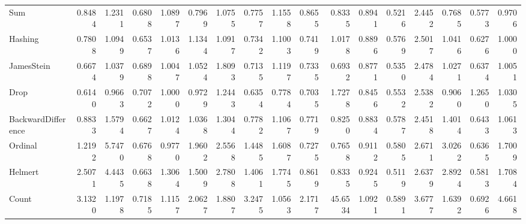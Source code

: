 \begin{tabular}{lrrrrrrrrrrrrrrrr}
Sum                &    0.8484 &            1.2311 &  0.6808 &   1.0897 &  0.7969 &   1.0755 &  0.7757 &  1.1558 &   0.8655 &   0.8335 &     0.8941 &     0.5216 &     2.4452 &          0.7685 &  0.5773 &     0.9706 \\
Hashing            &    0.7808 &            1.0949 &  0.6537 &   1.0136 &  1.1344 &   1.0917 &  0.7342 &  1.1003 &   0.7419 &   1.0178 &     0.8896 &     0.5769 &     2.5017 &          1.0416 &  0.6276 &     1.0000 \\
JamesStein         &    0.6674 &            1.0379 &  0.6898 &   1.0047 &  1.0524 &   1.8093 &  0.7135 &  1.1197 &   0.7335 &   0.6932 &     0.8771 &     0.5350 &     2.4784 &          1.0271 &  0.6374 &     1.0051 \\
Drop               &    0.6140 &            0.9663 &  0.7072 &   1.0000 &  0.9729 &   1.2443 &  0.6354 &  0.7784 &   0.7035 &   1.7278 &     0.8456 &     0.5532 &     2.5382 &          0.9060 &  1.2650 &     1.0305 \\
BackwardDifference &    0.8833 &            1.5794 &  0.6627 &   1.0124 &  1.0368 &   1.3044 &  0.7782 &  1.1067 &   0.7719 &   0.8250 &     0.8834 &     0.5787 &     2.4518 &          1.4014 &  0.6433 &     1.0613 \\
Ordinal            &    1.2192 &            5.7470 &  0.6768 &   0.9770 &  1.9602 &   2.5568 &  1.4485 &  1.6087 &   0.7275 &   0.7658 &     0.9112 &     0.5805 &     2.6711 &          3.0262 &  0.6365 &     1.7009 \\
Helmert            &    2.5071 &            4.4435 &  0.6638 &   1.3064 &  1.5009 &   2.7808 &  1.4061 &  1.7745 &   0.8619 &   0.8335 &     0.9245 &     0.5119 &     2.6379 &          2.8924 &  0.5813 &     1.7084 \\
Count              &    3.1320 &            1.1978 &  0.7185 &   1.1157 &  2.0627 &   1.8807 &  3.2475 &  1.0563 &   2.1717 &  45.6534 &     1.0921 &     0.5891 &     3.6777 &          1.6392 &  0.6926 &     4.6618 \\
\bottomrule
\end{tabular}
